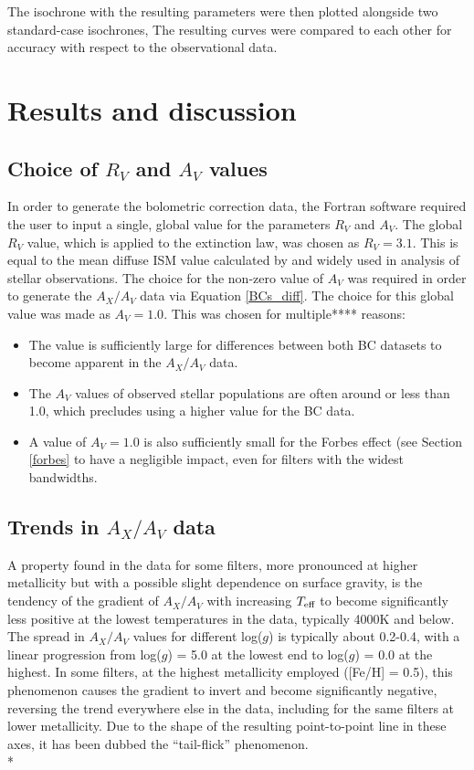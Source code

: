 \documentclass[12pt, a4paper]{report}
\begin{document}
The isochrone with the resulting parameters were then plotted alongside two standard-case isochrones, The resulting curves were compared to each other for accuracy with respect to the observational data.


\chapter{Results and discussion}

\section{Choice of $R_{V}$ and $A_{V}$ values}
In order to generate the bolometric correction data, the Fortran software required the user to input a single, global value for the parameters $R_{V}$ and $A_{V}$. The global $R_{V}$ value, which is applied to the \cite{1989ApJ...345..245C} extinction law, was chosen as $R_{V} = 3.1$. This is equal to the mean diffuse ISM value calculated by \cite{1985ApJ...288..618R} and widely used in analysis of stellar observations. The choice for the non-zero value of $A_{V}$ was required in order to generate the $A_{X}/A_{V}$ data via Equation \ref{BCs_diff}. The choice for this global value was made as $A_{V} = 1.0$. This was chosen for multiple**** reasons:

\begin{itemize}
\item The value is sufficiently large for differences between both BC datasets to become apparent in the $A_{X}/A_{V}$ data.
\item The $A_{V}$ values of observed stellar populations are often around or less than 1.0, which precludes using a higher value for the BC data.
\item A value of $A_{V} = 1.0$ is also sufficiently small for the Forbes effect (see Section \ref{forbes} to have a negligible impact, even for filters with the widest bandwidths.
\end{itemize}

\section{Trends in $A_{X}/A_{V}$ data}
A property found in the data for some filters, more pronounced at higher metallicity but with a possible slight dependence on surface gravity, is the tendency of the gradient of $A_{X}/A_{V}$ with increasing $T_{\textnormal{eff}}$ to become significantly less positive at the lowest temperatures in the data, typically 4000K and below. The spread in $A_{X}/A_{V}$ values for different log($g$) is typically about 0.2-0.4, with a linear progression from log($g$) = 5.0 at the lowest end to log($g$) = 0.0 at the highest. In some filters, at the highest metallicity employed ([Fe/H] = 0.5), this phenomenon causes the gradient to invert and become significantly negative, reversing the trend everywhere else in the data, including for the same filters at lower metallicity. Due to the shape of the resulting point-to-point line in these axes, it has been dubbed the ``tail-flick'' phenomenon.\\*
\end{document}

